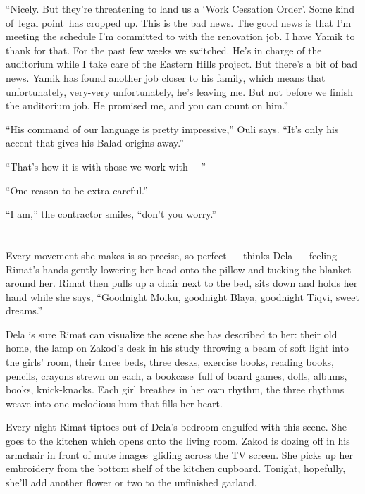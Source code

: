 \documentclass[twoside,11pt,openany]{book}
\begin{document}
``Nicely. But they're threatening to land us a `Work Cessation Order'. Some kind of~legal point~has cropped
up. This is the bad news. The good news is that I'm meeting the schedule I'm committed to with the renovation job.  I
have Yamik to thank for that. For the past few weeks we switched. He's in charge of the auditorium while I take care of
the Eastern Hills project. But there's a bit of bad news. Yamik has found another job closer to his family, which means
that unfortunately, very-very unfortunately, he's leaving me. But not before we finish the auditorium job. He
promised me, and you can count on him.''

``His command of our language is pretty impressive,'' Ouli says. ``It's only his
accent that gives his Balad origins away.''

``That's how it is with those we work with ---''

``One reason to be extra careful.''

``I am,'' the contractor smiles, ``don't you worry.''



\chapter{}

Every movement she makes is so precise, so perfect --- thinks Dela --- feeling Rimat's hands gently lowering her head onto
the pillow and tucking the blanket around her. Rimat then pulls up a chair next to the bed, sits down and holds her
hand while she says, ``Goodnight Moiku, goodnight Blaya, goodnight Tiqvi, sweet dreams.''

Dela is sure Rimat can visualize the scene she has described to her: their old home, the lamp on Zakod's desk in his
study throwing a beam of soft light into the girls{'} room, their three beds, three desks, exercise books, reading
books, pencils, crayons strewn on each, a bookcase~full of board games, dolls, albums, books, knick-knacks. Each girl
breathes in her own rhythm, the three rhythms weave into one melodious hum that fills her heart.

Every night Rimat tiptoes out of Dela's bedroom engulfed with this scene. She goes to the kitchen which opens onto the
living room.  Zakod is dozing off in his armchair in front of mute images~gliding across the TV screen. She picks up
her embroidery from the bottom shelf of the kitchen cupboard. Tonight, hopefully, she'll add another flower or two to
the unfinished garland.
\end{document}
